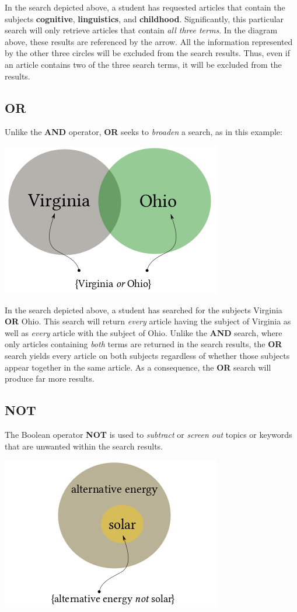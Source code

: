 \documentclass[book]{memoir}
\begin{document}
In the search depicted above, a student has requested articles that contain the subjects \textbf{cognitive}, \textbf{linguistics}, and \textbf{childhood}. Significantly, this particular search will only retrieve articles that contain \emph{all three terms}. In the diagram above, these results are referenced by the arrow. All the information represented by the other three circles will be excluded from the search results. Thus, even if an article contains two of the three search terms, it will be excluded from the results.

\subsection{OR}
Unlike the \textbf{AND} operator, \textbf{OR} seeks to \emph{broaden} a search, as in this example:

\begin{center}
\includegraphics[width=.45\textwidth]{Orcolor.png}
\end{center}

In the search depicted above, a student has searched for the subjects Virginia \textbf{OR} Ohio. This search will return \emph{every} article having the subject of Virginia as well as \emph{every} article with the subject of Ohio. Unlike the \textbf{AND} search, where only articles containing \emph{both} terms are returned in the search results, the \textbf{OR} search yields every article on both subjects regardless of whether those subjects appear together in the same article. As a consequence, the \textbf{OR} search will produce far more results.

\subsection{NOT}
The Boolean operator \textbf{NOT} is used to \emph{subtract} or \emph{screen out} topics or keywords that are unwanted within the search results. 


\begin{center}
\includegraphics[width=.45\textwidth]{notcolor.png}
\end{center}
\end{document}
